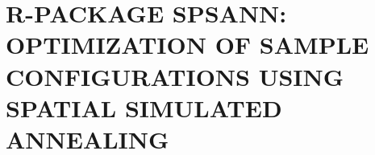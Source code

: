 \artigofalse
\chapter{R-PACKAGE SPSANN: OPTIMIZATION OF SAMPLE CONFIGURATIONS USING SPATIAL SIMULATED ANNEALING}
\label{apen:spsann}



% 
% 
% 
% 
% 
% 
